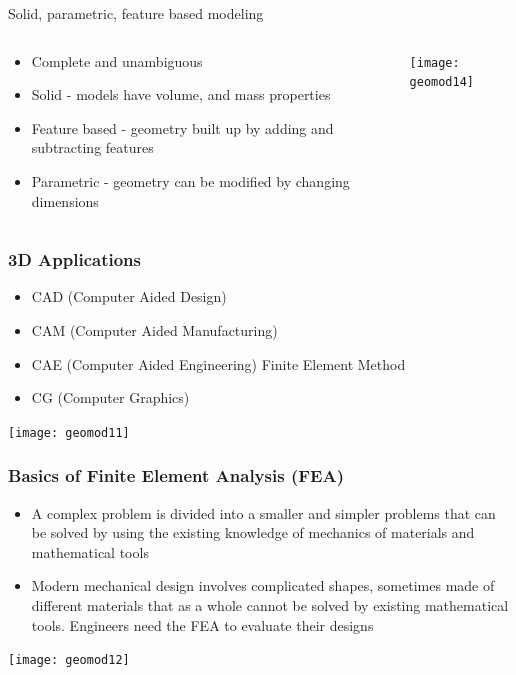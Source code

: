 \begin{frame}[fragile]{Solid, parametric, feature based modeling}
 \begin{columns}
  \begin{column}{0.55\linewidth}
\begin{itemize}
\item Complete and unambiguous
\item Solid - models have volume, and mass properties
\item Feature based - geometry built up by adding and subtracting features
\item Parametric - geometry can be modified by changing dimensions
\end{itemize}
  \end{column}%
  \begin{column}{0.45\linewidth}
			\begin{center}
	\texttt{[image: geomod14]}

			\end{center}
  \end{column}
 \end{columns}
 
\end{frame}




\begin{frame}[fragile]\frametitle{3D Applications}
\begin{itemize}
\item CAD (Computer Aided Design)
\item CAM (Computer Aided Manufacturing)
\item CAE (Computer Aided Engineering) Finite Element Method
\item CG (Computer Graphics)
\end{itemize}

			\begin{center}
	\texttt{[image: geomod11]}
			\end{center}
\end{frame}

\begin{frame}[fragile]\frametitle{Basics of Finite Element Analysis (FEA) }
\begin{itemize}
\item A complex problem is divided into a smaller and simpler problems that can be solved by using the existing knowledge of mechanics of materials and mathematical tools 
\item Modern mechanical design involves complicated shapes, sometimes made of different materials that as a whole cannot be solved by existing mathematical tools. Engineers need the FEA to evaluate their designs

\end{itemize}

			\begin{center}
	\texttt{[image: geomod12]}
			\end{center}
\end{frame}

